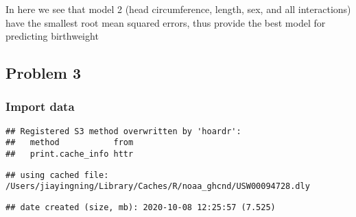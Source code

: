 \documentclass[]{article}
\newenvironment{Shaded}{\begin{snugshade}}{\end{snugshade}}
\newcommand{\DataTypeTok}[1]{\textcolor[rgb]{0.13,0.29,0.53}{#1}}
\newcommand{\DecValTok}[1]{\textcolor[rgb]{0.00,0.00,0.81}{#1}}
\newcommand{\KeywordTok}[1]{\textcolor[rgb]{0.13,0.29,0.53}{\textbf{#1}}}
\newcommand{\NormalTok}[1]{#1}
\newcommand{\OperatorTok}[1]{\textcolor[rgb]{0.81,0.36,0.00}{\textbf{#1}}}
\newcommand{\StringTok}[1]{\textcolor[rgb]{0.31,0.60,0.02}{#1}}
\begin{document}
In here we see that model 2 (head circumference, length, sex, and all
interactions) have the smallest root mean squared errors, thus provide
the best model for predicting birthweight

\hypertarget{problem-3}{%
\subsection{Problem 3}\label{problem-3}}

\hypertarget{import-data-1}{%
\subsubsection{Import data}\label{import-data-1}}

\begin{Shaded}
\end{Shaded}

\begin{verbatim}
## Registered S3 method overwritten by 'hoardr':
##   method           from
##   print.cache_info httr
\end{verbatim}

\begin{verbatim}
## using cached file: /Users/jiayingning/Library/Caches/R/noaa_ghcnd/USW00094728.dly
\end{verbatim}

\begin{verbatim}
## date created (size, mb): 2020-10-08 12:25:57 (7.525)
\end{verbatim}
\end{document}
